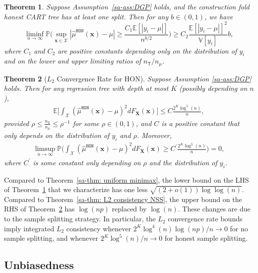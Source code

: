\documentclass[10pt]{article}
\def\treeT{\mathsf{T}}
\def\bx{\mathbf{x}}
\def\bX{\mathbf{X}}
\def\X{\mathcal{X}}
\def\E{\mathbb{E}}
\def\P{\mathbb{P}}
\def\V{\mathbb{V}}
\def\muhonest{\hat{\mu}^{\mathtt{HON}}}
\newtheorem{theorem}{Theorem}%
\theoremstyle{definition}
\theoremstyle{remark}
\begin{document}
\begin{theorem}\label{sa-thm: honest stump}
Suppose Assumption~\ref{sa-ass:DGP} holds, and the construction fold honest CART tree has at least one split. Then for any $b \in (0, 1) $, we have
\begin{equation*}
    \liminf_{n\to\infty} \mathbb{P}\Bigg(\sup_{\bx\in\mathcal{X}}|\muhonest(\bx) - \mu| \geq \frac{C_1\E[|y_i - \mu|]}{n^{b/2}}\Bigg) \geq C_2 \frac{\E[|y_i - \mu|]^2}{\V[y_i]} b,
\end{equation*}
where $C_1$ and $C_2$ are positive constants depending only on the distribution
of $y_i$ and on the lower and upper limiting ratios of $n_{\treeT}/n_{\mu}$.
\end{theorem}

\begin{theorem}[$L_2$ Convergence Rate for HON]\label{sa-thm: L2 consistency honest}
Suppose Assumption \ref{sa-ass:DGP} holds. Then for any regression tree with depth at most $K$ (possibly depending on $n$),
\begin{align*}
    \E \bigg[ \int_{\X} (\muhonest(\bx) - \mu)^2 dF_{\bX}(\bx)\bigg] \leq C \frac{2^K \log^5(n) }{n},
\end{align*}
provided $\rho \leq \frac{n_{\treeT}}{n_{\mu}} \leq \rho^{-1}$ for some $\rho \in (0,1)$, and $C$ is a positive constant that only depends on the distribution of $y_i$ and $\rho$. Moreover,
\begin{align*}
    \limsup_{n \to \infty} \P \bigg(\int_{\X} (\muhonest(\bx) - \mu)^2 dF_{\bX}(\bx) \geq C^{\prime} \frac{2^K \log^5(n)}{n} \bigg) = 0,
\end{align*}
where $C^{\prime}$ is some constant only depending on $\rho$ and the distribution of $y_i$. 
\end{theorem}

Compared to Theorem~\ref{sa-thm: uniform minimax}, the lower bound on the LHS of Theorem~\ref{sa-thm: honest stump} that we characterize has one less $\sqrt{(2 + o(1)) \log \log (n)}$. Compared to Theorem~\ref{sa-thm: L2 consistency NSS}, the upper bound on the RHS of Theorem~\ref{sa-thm: L2 consistency honest} has $\log(np)$ replaced by $\log(n)$. These changes are due to the sample splitting strategy.
In particular, the $L_2$ convergence rate bounds imply integrated $L_2$ consistency whenever $2^K\log^4(n)\log(np)/n\to0$ for no sample splitting, and whenever $2^K\log^5(n)/n\to0$ for honest sample splitting.

\subsection{Unbiasedness}\label{sa-sec:reg-unbiased}
\end{document}
